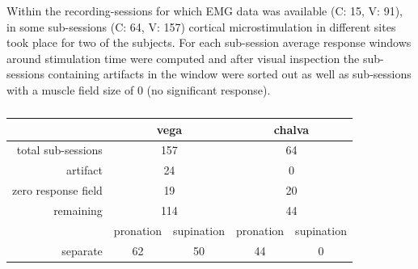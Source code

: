 Within the recording-sessions for which EMG data was available (C: 15, V: 91), in some sub-sessions (C: 64, V: 157) cortical microstimulation in different sites took place for two of the subjects. For each sub-session average response windows around stimulation time were computed and after visual inspection the sub-sessions containing artifacts in the window were sorted out as well as sub-sessions with a muscle field size of 0 (no significant response). 
\begin{table}[ht]
	\centering
	\begin{tabular}{r|cc|cc}
		\toprule
		                    & \multicolumn{2}{c}{vega}  & \multicolumn{2}{c}{chalva}  \\
	    \midrule
		total sub-sessions  & \multicolumn{2}{c}{157}   & \multicolumn{2}{c}{64}    \\
		artifact            & \multicolumn{2}{c}{24}    & \multicolumn{2}{c}{0}        \\
		zero response field & \multicolumn{2}{c}{19}    & \multicolumn{2}{c}{20}       \\
		\bottomrule
		remaining           & \multicolumn{2}{c}{114}   & \multicolumn{2}{c}{44}       \\
		                    & pronation & supination    & pronation & supination \\
		separate            & 62        & 50            & 44        & 0         \\
		\bottomrule
	\end{tabular}
	\caption{}
	\label{sg:tab:sorting_table_evoked}	
\end{table}

